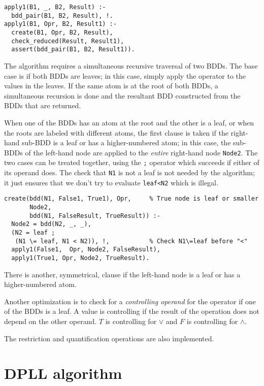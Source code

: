 \documentclass[11pt]{article}
\newcommand*{\p}[1]{\textup{\texttt{#1}}}
\begin{document}
\begin{verbatim}
apply1(B1, _, B2, Result) :-
  bdd_pair(B1, B2, Result), !.
apply1(B1, Opr, B2, Result1) :-
  create(B1, Opr, B2, Result),
  check_reduced(Result, Result1),
  assert(bdd_pair(B1, B2, Result1)).
\end{verbatim}

The algorithm requires a simultaneous recursive traversal of two BDDs.
The base case is if both BDDs are leaves; in this case, simply apply the
operator to the values in the leaves. If the same atom is at the root of
both BDDs, a simultaneous recursion is done and the resultant BDD
constructed from the BDDs that are returned.

When one of the BDDs has an atom at the root and the other is a leaf, or
when the roots are labeled with different atoms, the first clause is
taken if the right-hand sub-BDD is a leaf or has a higher-numbered atom;
in this case, the sub-BDDs of the left-hand node are applied to the
\emph{entire} right-hand node \p{Node2}. The two cases can be treated
together, using the \p{;} operator which succeeds if either of its
operand does. The check that \p{N1} is not a leaf is not needed by the
algorithm; it just ensures that we don't try to evaluate \p{leaf<N2}
which is illegal.

\begin{verbatim}
create(bdd(N1, False1, True1), Opr,     % True node is leaf or smaller
       Node2,
       bdd(N1, FalseResult, TrueResult)) :-
  Node2 = bdd(N2, _, _),                   
  (N2 = leaf ;
   (N1 \= leaf, N1 < N2)), !,           % Check N1\=leaf before "<"
  apply1(False1,  Opr, Node2, FalseResult),
  apply1(True1, Opr, Node2, TrueResult).
\end{verbatim}

There is another, symmetrical, clause if the left-hand node is a leaf or
has a higher-numbered atom.

Another optimization is to check for a \emph{controlling operand}
for the operator if one of the BDDs is a leaf. A value is controlling if
the result of the operation does not depend on the other operand. $T$ is
controlling for $\vee$ and $F$ is controlling for $\wedge$.

The restriction and quantification operations are also implemented.



\section{DPLL algorithm}
\end{document}

